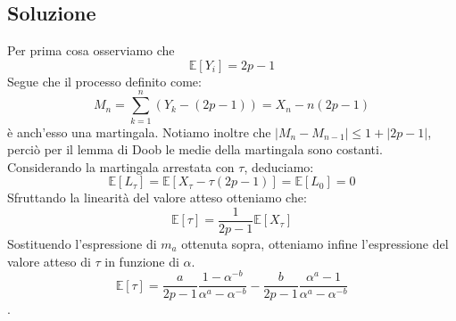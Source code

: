 \documentclass[
	12pt, %
]{fphw}
\begin{document}
\subsection*{Soluzione}
Per prima cosa osserviamo che
\begin{equation*}
\mathbb{E}[Y_i] = 2p-1
\end{equation*}
Segue che il processo definito come:
\begin{equation*}
M_n = \sum_{k = 1}^n (Y_k - (2p-1))  = X_n - n(2p-1)
\end{equation*}
è anch'esso una martingala.
Notiamo inoltre che $|M_n - M_{n-1}| \leq 1 + |2p-1|$, perciò per il lemma di Doob le medie della martingala sono costanti.
Considerando la martingala arrestata con $\tau$, deduciamo:
\begin{equation*}
\mathbb{E}[L_{\tau}] = \mathbb{E}[X_{\tau} - \tau(2p-1)] = \mathbb{E}[L_{0}] = 0
\end{equation*}
Sfruttando la linearità del valore atteso otteniamo che:
\begin{equation*}
\mathbb{E}[\tau] = \frac{1}{2p-1} \mathbb{E}[X_{\tau}]
\end{equation*}
Sostituendo l'espressione di $m_a$ ottenuta sopra, otteniamo infine l'espressione del valore atteso di $\tau$ in funzione di $\alpha$.
\begin{equation*}
\mathbb{E}[\tau] = \frac{a}{2p-1} \frac{1-\alpha^{-b}}{\alpha^{a}-\alpha^{-b}} - \frac{b}{2p-1} \frac{\alpha^{a}-1}{\alpha^{a}-\alpha^{-b}}
\end{equation*}.
\end{document}

